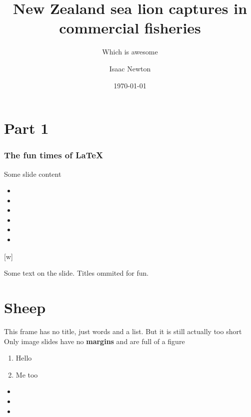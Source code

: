 \documentclass[xcolor={table}]{beamer}
\title{New Zealand sea lion captures in commercial fisheries}
\subtitle{Which is awesome}
\author{Isaac Newton}
\date{\today}
\begin{document}
\titleslide

\section{Part 1}

\begin{frame}
  \frametitle{The fun times of \LaTeX}
  Some slide content
\begin{itemize}
  \item \the\topmargin
  \item \the\headheight
  \item \the\headsep
  \item \the\textheight
  \item \the\footskip
  \item \the\paperheight
\end{itemize}
\end{frame}

[w]%


{
  \begin{frame}{}{}
    {\color{logo-blue}Some text on the slide. Titles ommited for fun.}
  \end{frame}
}
\section{Sheep}

\begin{frame}{This frame has no title, just words and a list. But it is still actually
  too short}
  Only image slides have no \textbf{margins} and are full of a figure


\begin{enumerate}
  \item Hello
  \item Me too
\end{enumerate}
\begin{itemize}
  \item \the\paperheight
  \item \the\footskip
  \item \the\textheight
\end{itemize}
 \end{frame}
\end{document}
